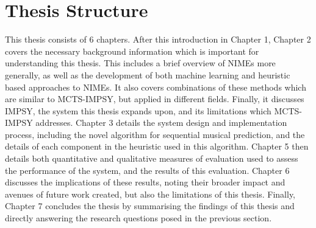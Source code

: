 \section{Thesis Structure}
This thesis consists of 6 chapters. After this introduction in Chapter 1, Chapter 2 covers the necessary background information which is important for understanding this thesis. This includes a brief overview of NIMEs more generally, as well as the development of both machine learning and heuristic based approaches to NIMEs. It also covers combinations of these methods which are similar to MCTS-IMPSY, but applied in different fields. Finally, it discusses IMPSY, the system this thesis expands upon, and its limitations which MCTS-IMPSY addresses. Chapter 3 details the system design and implementation process, including the novel algorithm for sequential musical prediction, and the details of each component in the heuristic used in this algorithm. Chapter 5 then details both quantitative and qualitative measures of evaluation used to assess the performance of the system, and the results of this evaluation. Chapter 6 discusses the implications of these results, noting their broader impact and avenues of future work created, but also the limitations of this thesis. Finally, Chapter 7 concludes the thesis by summarising the findings of this thesis and directly answering the research questions posed in the previous section.












